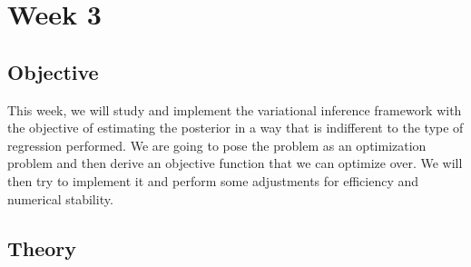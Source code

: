 \section{Week 3}
\subsection{Objective}
This week, we will study and implement the variational inference framework with the objective of
estimating the posterior in a way that is indifferent to the type of regression performed.
We are going to pose the problem as an optimization problem and then derive an objective function that we can optimize over.
We will then try to implement it and perform some adjustments for efficiency and numerical stability.
\subsection{Theory}
